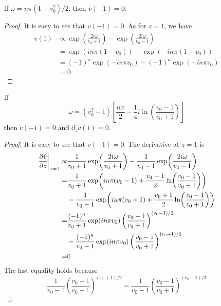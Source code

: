 \begin{theorem}
    If $\omega = n\pi(1-v_0^2)/2$, then $\tilde{v}(\pm 1) = 0$.
\end{theorem}
\begin{proof}
    It is easy to see that $v(-1)=0$. As for $z=1$, we have
    \begin{align*}
        \tilde{v}(1) &\propto
        \exp(\frac{2i\omega}{v_0+1}) - \exp(\frac{2i\omega}{v_0-1}) \\
        &=
        \exp(in\pi(1-v_0)) - \exp(-in\pi(1+v_0)) \\
        &=
        (-1)^n\exp(-in\pi v_0) - (-1)^n\exp(-in\pi v_0) \\
        &= 0
    \end{align*}
\end{proof}

\begin{theorem}
    If 
    \[\omega = (v_0^2-1) \left[ \frac{n\pi}{2} - \frac{1}{4}i\ln\left(\frac{v_0-1}{v_0+1}\right) \right]\]
    then $\tilde{v}(-1) = 0$ and $\partial_z\tilde{v}(1) = 0$.
\end{theorem}
\begin{proof}
    It is easy to see that $v(-1)=0$. The derivative at $z=1$ is
    \begin{align*}
        \eval{\pdv{\tilde{v}}{z}}_{z=1} \propto&
        \frac{1}{v_0+1}\exp(\frac{2i\omega}{v_0+1}) - \frac{1}{v_0-1}\exp(\frac{2i\omega}{v_0-1}) \\
        =& \frac{1}{v_0+1}\exp(in\pi(v_0-1) + \frac{v_0-1}{2}\ln(\frac{v_0-1}{v_0+1})) \\
        &- \frac{1}{v_0-1}\exp(in\pi(v_0+1) + \frac{v_0+1}{2}\ln(\frac{v_0-1}{v_0+1})) \\
        =& \frac{(-1)^n}{v_0+1}\exp(in\pi v_0)\left(\frac{v_0-1}{v_0+1}\right)^{(v_0-1)/2} \\
        &- \frac{(-1)^n}{v_0-1}\exp(in\pi v_0)\left(\frac{v_0-1}{v_0+1}\right)^{(v_0+1)/2} \\
        =& 0
    \end{align*}
    The last equality holds because 
    \[ \frac{1}{v_0-1}\left(\frac{v_0-1}{v_0+1}\right)^{(v_0+1)/2} 
    = \frac{1}{v_0+1}\left(\frac{v_0-1}{v_0+1}\right)^{(v_0-1)/2}  \]
\end{proof}